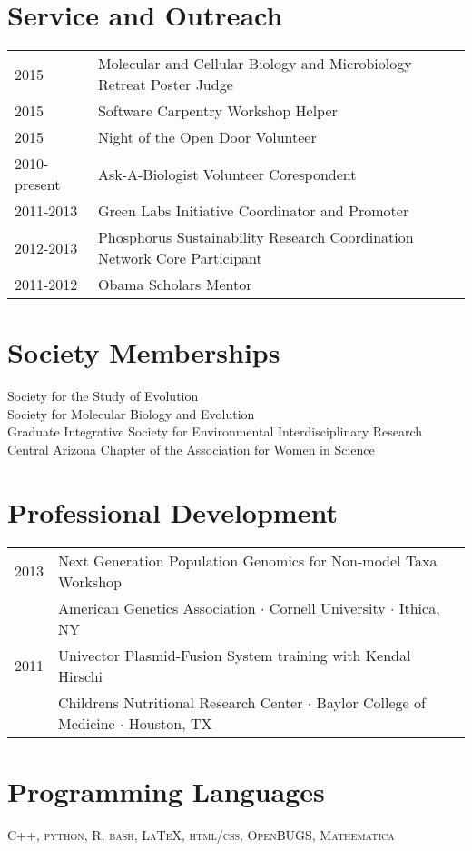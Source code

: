 \documentclass[11pt]{article}
\begin{document}
\section*{Service and Outreach}
\begin{tabularx}{\linewidth}{lX}
2015 &Molecular and Cellular Biology and Microbiology Retreat Poster Judge\\
2015 &Software Carpentry Workshop Helper\\
2015 &Night of the Open Door Volunteer\\
2010-present &Ask-A-Biologist Volunteer Corespondent\\
2011-2013&Green Labs Initiative Coordinator and Promoter\\
2012-2013&Phosphorus Sustainability Research Coordination Network Core Participant\\
2011-2012&Obama Scholars Mentor\\
\end{tabularx}
\section*{Society Memberships}
Society for the Study of Evolution\\
Society for Molecular Biology and Evolution\\
Graduate Integrative Society for Environmental Interdisciplinary Research\\
Central Arizona Chapter of the Association for Women in Science
\section*{Professional Development}
\begin{tabularx}{\linewidth}{l X}
2013&Next Generation Population Genomics for Non-model Taxa Workshop\\
&American Genetics Association $\cdotp$ Cornell University $\cdotp$ Ithica, NY\\

2011& Univector Plasmid-Fusion System training with Kendal Hirschi\\
&Childrens Nutritional Research Center $\cdotp$ Baylor College of Medicine $\cdotp$ Houston, TX\\

\end{tabularx}
\section*{Programming Languages}
\textsc{C++, python, R, bash, \LaTeX, html/css, OpenBUGS, Mathematica}
\end{document}

